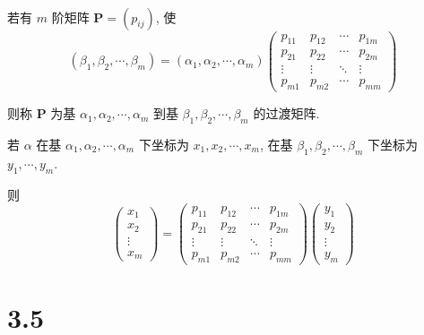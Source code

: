  \paragraph{} %
	 若有 \( m \) 阶矩阵 \( \boldsymbol{P} = (p_{ij}) \), 使
	 \[ (\beta_{1}, \beta_{2}, \cdots, \beta_{m}) = (\alpha_{1}, \alpha_{2}, \cdots, \alpha_{m}) \begin{pmatrix} p_{11} & p_{12} & \cdots & p_{1m} \\ p_{21} & p_{22} & \cdots & p_{2m} \\ \vdots & \vdots & \ddots & \vdots \\ p_{m1} & p_{m2} & \cdots & p_{mm} \end{pmatrix} \]

	 则称 \(\boldsymbol{P}\) 为基 \( \alpha_{1}, \alpha_{2}, \cdots, \alpha_{m} \) 到基 \( \beta_{1}, \beta_{2}, \cdots, \beta_{m} \) 的过渡矩阵.

	 若 \( \alpha \) 在基 \( \alpha_{1}, \alpha_{2}, \cdots, \alpha_{m} \) 下坐标为 \( x_{1}, x_{2}, \cdots, x_{m} \), 在基 \( \beta_{1}, \beta_{2}, \cdots, \beta_{m} \) 下坐标为 \( y_{1}, \cdots, y_{m} \).

	 则
	 \[ \begin{pmatrix} x_{1} \\ x_{2} \\ \vdots \\ x_{m} \end{pmatrix} = \begin{pmatrix} p_{11} & p_{12} & \cdots & p_{1m} \\ p_{21} & p_{22} & \cdots & p_{2m} \\ \vdots & \vdots & \ddots & \vdots \\ p_{m1} & p_{m2} & \cdots & p_{mm} \end{pmatrix} \begin{pmatrix} y_{1} \\ y_{2} \\ \vdots \\ y_{m} \end{pmatrix} \]


\section{3.5}
 \subsection{} %
